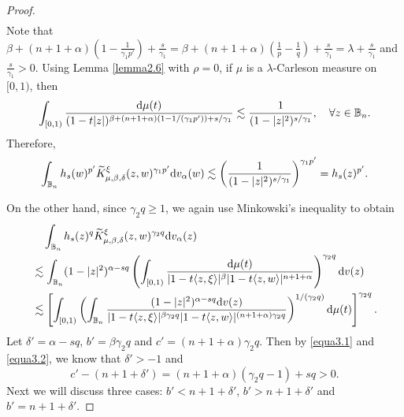 \documentclass[preprint,12pt,times]{elsarticle}
\theoremstyle{definition}
\theoremstyle{remark}
\numberwithin{equation}{section}
\begin{document}
\begin{proof}
\begin{align*}
\end{align*}
Note that $\beta+(n+1+\alpha)(1-\frac{1}{\gamma_1p'})+\frac{s}{\gamma_1}=\beta+(n+1+\alpha)(\frac{1}{p}-\frac{1}{q})+\frac{s}{\gamma_1}=\lambda+\frac{s}{\gamma_1}$ and $\frac{s}{\gamma_1}>0$. Using Lemma \ref{lemma2.6} with $\rho=0$, if $\mu$ is a $\lambda$-Carleson measure on $[0,1)$, then 
  \begin{align*}
\int_{[0,1)}\frac{{\rm d}\mu(t)}{(1-t|z|)^{\beta+(n+1+\alpha)(1-1/(\gamma_1p'))+s/\gamma_1}}\lesssim \frac{1}{(1-|z|^2)^{s/\gamma_1}},\quad \forall z\in\mathbb{B}_n.
\end{align*} 
Therefore,
\begin{equation}\label{equa3.3}
\int_{\mathbb{B}_n}h_s(w)^{p'}\widetilde{K}_{\mu,\beta,\delta}^{\xi}(z,w)^{\gamma_1p'}{\rm d}v_{\alpha}(w)\lesssim \left(\frac{1}{(1-|z|^2)^{s/\gamma_1}}\right)^{\gamma_1p'}=h_s(z)^{p'}.
\end{equation}

On the other hand, since $\gamma_2q\geq 1$, we again use Minkowski's inequality to obtain
\begin{equation}\label{equa3.4}
\begin{split}
&\quad \int_{\mathbb{B}_n}h_s(z)^q\widetilde{K}_{\mu,\beta,\delta}^{\xi}(z,w)^{\gamma_2q}{\rm d}v_{\alpha}(z)\\
&\lesssim \int_{\mathbb{B}_n}(1-|z|^2)^{\alpha-sq}\left(\int_{[0,1)}\frac{{\rm d}\mu(t)}{|1-t\langle z,\xi\rangle|^{\beta}|1-t\langle z,w\rangle|^{n+1+\alpha}}\right)^{\gamma_2q}{\rm d}v(z)\\
&\lesssim \left[\int_{[0,1)}\left(\int_{\mathbb{B}_n}\frac{(1-|z|^2)^{\alpha-sq}{\rm d}v(z)}{|1-t\langle z,\xi\rangle|^{\beta\gamma_2q}|1-t\langle z,w\rangle|^{(n+1+\alpha)\gamma_2q}}\right)^{1/(\gamma_2q)}{\rm d}\mu(t)\right]^{\gamma_2q}.
\end{split}
\end{equation}
Let $\delta'=\alpha-sq$, $b'=\beta\gamma_2q$ and $c'=(n+1+\alpha)\gamma_2q$. Then by \eqref{equa3.1} and \eqref{equa3.2}, we know that   $\delta'>-1$  and
\[
    c'-(n+1+\delta')=(n+1+\alpha)(\gamma_2q-1)+sq>0.
\]
Next we will discuss three cases: $b'<n+1+\delta'$, $b'>n+1+\delta'$ and $b'=n+1+\delta'$.


\end{proof}
\end{document}
